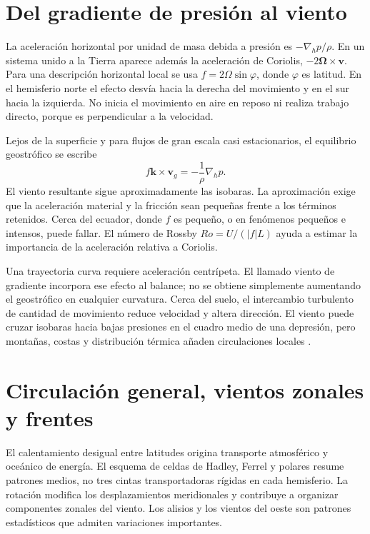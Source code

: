 \section{Del gradiente de presión al viento}
La aceleración horizontal por unidad de masa debida a presión es $-\nabla_h p/\rho$. En un sistema unido a la Tierra aparece además la aceleración de Coriolis, $-2\boldsymbol{\Omega}\times\boldsymbol{v}$. Para una descripción horizontal local se usa $f=2\Omega\sin\varphi$, donde $\varphi$ es latitud. En el hemisferio norte el efecto desvía hacia la derecha del movimiento y en el sur hacia la izquierda. No inicia el movimiento en aire en reposo ni realiza trabajo directo, porque es perpendicular a la velocidad.

Lejos de la superficie y para flujos de gran escala casi estacionarios, el equilibrio geostrófico se escribe
\begin{equation}
 f\boldsymbol{k}\times\boldsymbol{v}_g=-\frac{1}{\rho}\nabla_h p.
\end{equation}
El viento resultante sigue aproximadamente las isobaras. La aproximación exige que la aceleración material y la fricción sean pequeñas frente a los términos retenidos. Cerca del ecuador, donde $f$ es pequeño, o en fenómenos pequeños e intensos, puede fallar. El número de Rossby $Ro=U/(|f|L)$ ayuda a estimar la importancia de la aceleración relativa a Coriolis.

Una trayectoria curva requiere aceleración centrípeta. El llamado viento de gradiente incorpora ese efecto al balance; no se obtiene simplemente aumentando el geostrófico en cualquier curvatura. Cerca del suelo, el intercambio turbulento de cantidad de movimiento reduce velocidad y altera dirección. El viento puede cruzar isobaras hacia bajas presiones en el cuadro medio de una depresión, pero montañas, costas y distribución térmica añaden circulaciones locales \cite{TAE2}.

\section{Circulación general, vientos zonales y frentes}
El calentamiento desigual entre latitudes origina transporte atmosférico y oceánico de energía. El esquema de celdas de Hadley, Ferrel y polares resume patrones medios, no tres cintas transportadoras rígidas en cada hemisferio. La rotación modifica los desplazamientos meridionales y contribuye a organizar componentes zonales del viento. Los alisios y los vientos del oeste son patrones estadísticos que admiten variaciones importantes.

